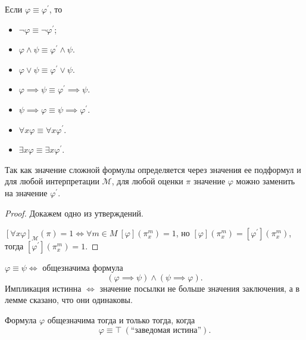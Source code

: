 \documentclass[a4paper, fleqn]{article}
\begin{document}
    \begin{lemma}
        Если $\varphi \equiv \varphi^{\prime}$, то
        \begin{itemize}[topsep=0pt]
            \item $\neg \varphi \equiv \neg \varphi^{\prime}$;
            \item $\varphi \land \psi \equiv \varphi^{\prime} \land \psi$.
            \item $\varphi \lor \psi \equiv \varphi^{\prime} \lor \psi$.
            \item $\varphi \implies \psi \equiv \varphi^{\prime} \implies \psi$.
            \item $\psi \implies \varphi \equiv \psi \implies \varphi^{\prime}$.
            \item $\forall x \varphi \equiv \forall x \varphi^{\prime}$.
            \item $\exists x \varphi \equiv \exists x \varphi^{\prime}$.
        \end{itemize}
        Так как значение сложной формулы определяется через значения ее подформул и 
        для любой интерпретации $\mathcal{M}$, для любой оценки $\pi$ значение 
        $\varphi$ можно заменить на значение $\varphi^{\prime}$.
    \end{lemma}

    \begin{proof}
        Докажем одно из утверждений. 

        $[\forall x \varphi]_{\mathcal{M}}(\pi) = 1 
        \iff \forall m \in M~[\varphi]\left( \pi_{x}^{m} \right) = 1$, 
        но $[\varphi]\left( \pi_{x}^{m} \right) = 
        [\varphi^{\prime}]\left( \pi_{x}^{m} \right)$, тогда 
        $[\varphi^{\prime}]\left( \pi_{x}^{m} \right) = 1$.
    \end{proof}

    \begin{lemma}
        $\varphi \equiv \psi \iff $ общезначима формула
        \[
            (\varphi \implies \psi) \land (\psi \implies \varphi).
        \]
        Импликация истинна $\iff$ значение посылки не больше значения заключения, 
        а в лемме сказано, что они одинаковы.
    \end{lemma}
    \begin{lemma}
        Формула $\varphi$ общезначима тогда и только тогда, когда
        \[
            \varphi \equiv \top \ (\text{``заведомая истина''}).
        \]
    \end{lemma}
\end{document}
